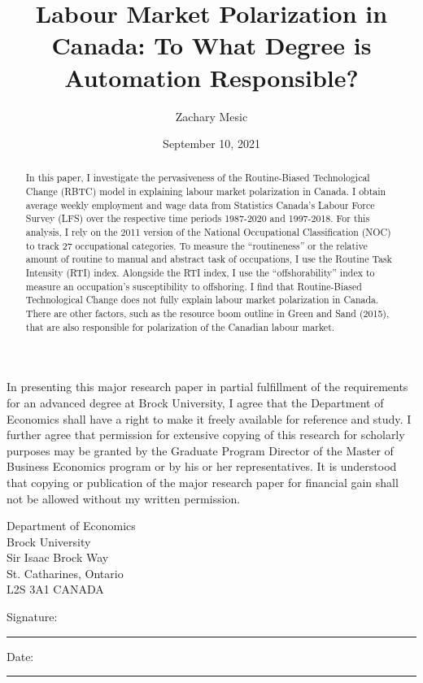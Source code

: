 \documentclass[undefended]{bumrp}
\title{Labour Market Polarization in Canada: To What Degree is Automation Responsible?}
\author{Zachary Mesic}
\date{September 10,  2021}     %
\begin{document}
\frontmatter
\maketitle{}
\makecommittee{}

\begin{Agreement}
In presenting this major research paper in partial fulfillment of the requirements for an advanced degree at Brock University, I agree that the Department of Economics shall have a right to make it freely available for reference and study.  I further agree that permission for extensive copying of this research for scholarly purposes may be granted by the Graduate Program Director of the Master of Business Economics program or by his or her representatives.  It is understood that copying or publication of the major research paper for financial gain shall not be allowed without my written permission.

\vspace{2cm}

\noindent
Department of Economics\\
\noindent Brock University\\
 Sir Isaac Brock Way\\
\noindent St. Catharines, Ontario\\
\noindent L2S 3A1 CANADA

\vspace{2cm}
\noindent Signature:\hspace{0.5cm}\rule{6cm}{0.01cm}\hfill Date:\hspace{0.5cm}\rule{4cm}{0.01cm}

\end{Agreement}

\begin{abstract}
	In this paper, I investigate the pervasiveness of the Routine-Biased Technological Change (RBTC) model in explaining labour market polarization in Canada. I obtain average weekly employment and wage data from Statistics Canada’s Labour Force Survey (LFS) over the respective time periods 1987-2020 and 1997-2018. For this analysis, I rely on the 2011 version of the National Occupational Classification (NOC) to track 27 occupational categories. To measure the “routineness” or the relative amount of routine to manual and abstract task of occupations, I use the Routine Task Intensity (RTI) index. Alongside the RTI index, I use the “offshorability” index to measure an occupation’s susceptibility to offshoring. I find that Routine-Biased Technological Change does not fully explain labour market polarization in Canada. There are other factors, such as the resource boom outline in Green and Sand (2015), that are also responsible for polarization of the Canadian labour market.
\end{abstract}
\end{document}
